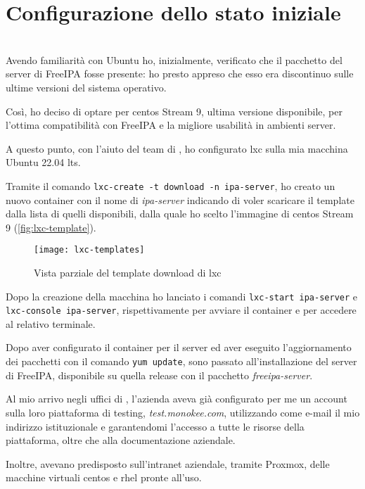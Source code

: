 
\chapter{Configurazione dello stato iniziale}
\label{cap:configurazione-stato-iniziale}

\\

Avendo familiarità con Ubuntu ho, inizialmente, verificato che il pacchetto del server di FreeIPA fosse presente: ho presto appreso che esso era discontinuo sulle ultime versioni del sistema operativo.

Così, ho deciso di optare per \acrshort{centos} Stream 9, ultima versione disponibile, per l'ottima compatibilità con FreeIPA e la migliore usabilità in ambienti server.

A questo punto, con l'aiuto del team di \myAzienda, ho configurato \acrshort{lxc} sulla mia macchina Ubuntu 22.04 \acrfull{lts}.

Tramite il comando \texttt{lxc-create -t download -n ipa-server}, ho creato un nuovo container con il nome di \emph{ipa-server} indicando di voler scaricare il template dalla lista di quelli disponibili, dalla quale ho scelto l'immagine di \acrshort{centos} Stream 9 (\autoref{fig:lxc-template}).

\begin{figure}[!h] 
    \centering 
    \texttt{[image: lxc-templates]} 
    \caption{Vista parziale del template download di \acrshort{lxc}}
    \label{fig:lxc-template}
\end{figure}

Dopo la creazione della macchina ho lanciato i comandi \texttt{lxc-start ipa-server} e \texttt{lxc-console ipa-server}, rispettivamente per avviare il container e per accedere al relativo terminale.


Dopo aver configurato il container per il server ed aver eseguito l'aggiornamento dei pacchetti con il comando \texttt{yum update}, sono passato all'installazione del server di FreeIPA, disponibile su quella release con il pacchetto \emph{freeipa-server}.


Al mio arrivo negli uffici di \myAzienda, l'azienda aveva già configurato per me un account sulla loro piattaforma di testing, \emph{test.monokee.com}, utilizzando come e-mail il mio indirizzo istituzionale e garantendomi l'accesso a tutte le risorse della piattaforma, oltre che alla documentazione aziendale.

Inoltre, avevano predisposto sull'intranet aziendale, tramite Proxmox, delle macchine virtuali \acrshort{centos} e \acrshort{rhel} pronte all'uso.